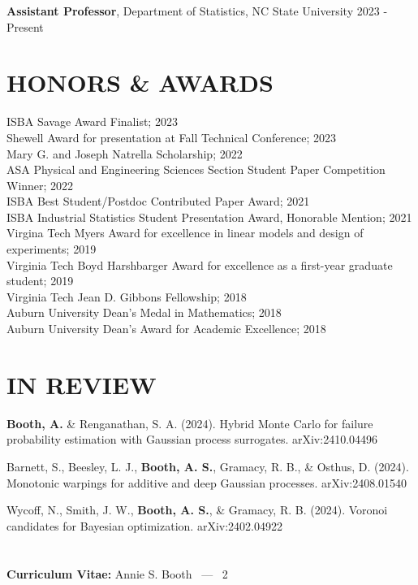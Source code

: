 \documentclass[margin,line,11pt]{res}
\begin{document}
\begin{resume}
{\bf Assistant Professor}, Department of Statistics, 
NC State University \hfill 2023 - Present

\bigskip
\section{\bf HONORS \& AWARDS}

ISBA Savage Award Finalist; 2023 \\
Shewell Award for presentation at Fall Technical Conference; 2023 \\
Mary G. and Joseph Natrella Scholarship; 2022 \\
ASA Physical and Engineering Sciences Section Student Paper Competition Winner; 2022 \\
ISBA Best Student/Postdoc Contributed Paper Award; 2021 \\
ISBA Industrial Statistics Student Presentation Award, Honorable Mention; 2021 \\
Virgina Tech Myers Award for excellence in linear models and design of experiments; 2019 \\
Virginia Tech Boyd Harshbarger Award for excellence as a first-year graduate student; 2019 \\
Virginia Tech Jean D. Gibbons Fellowship; 2018 \\
Auburn University Dean's Medal in Mathematics; 2018 \\
Auburn University Dean's Award for Academic Excellence; 2018

\medskip
\section{\bf{IN REVIEW}}

{\bf Booth, A.} \& Renganathan, S. A. (2024). Hybrid Monte Carlo for failure probability estimation with Gaussian process surrogates. arXiv:2410.04496

Barnett, S., Beesley, L. J., {\bf Booth, A. S.}, Gramacy, R. B., \& Osthus, D. (2024). Monotonic 
warpings for additive and deep Gaussian processes. arXiv:2408.01540

Wycoff, N., Smith, J. W., {\bf Booth, A. S.}, \& Gramacy, R. B. (2024). Voronoi candidates 
for Bayesian optimization. arXiv:2402.04922

\pagebreak
\section{}
\hfill {\bf Curriculum Vitae:} Annie S. Booth \  --- \  2
\medskip


\end{resume}
\end{document}
